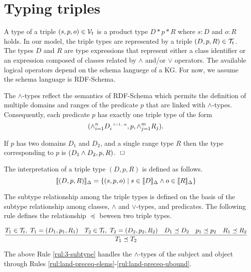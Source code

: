 \documentclass[runningheads]{llncs}
\newcommand{\s}{\scriptscriptstyle\ \,}
\newcommand{\llb}{\llbracket}
\newcommand{\rrb}{\rrbracket}
\newcommand{\V}{{\cal V}}
\newcommand{\T}{{\cal T}}
\newcommand{\finbox}{\phantom{.}\hfill\Box}
\begin{document}
\section{Typing triples\label{sec:triples}}



A type of a triple $(s,p,o)\in\V_t$ is a product type $D*p*R$
where $s:D$ and $o:R$ holds. In our model, the triple types are
represented by a triple $(D,p,R)\in\T_t$. The types $D$ and $R$ are
type expressions that represent either a class identifier or an 
expression composed of classes related by $\land$ and/or $\lor$
operators. The available logical operators depend on the schema
languege of a KG. For now, we assume the schema language is
RDF-Schema.

The $\land$-types reflect the semantics of RDF-Schema \cite{rdfschema}
which permits the definition of multiple domains and ranges of the
predicate $p$ that are linked with $\land$-types. Consequently, each
predicate $p$ has exactly one triple type of the form
$$(\land_{i=1}^n\/D_i^{\s\/i=1..n}, p ,\land_{j=1}^m\/R_j).$$

\begin{example}
  If $p$ has two domains $D_1$ and $D_2$, and a single
range type $R$ then the type corresponding to $p$ is
$(D_1\land\/D_2,p,R)$. $\finbox$
\end{example}

\noindent
The interpretation of a triple type $(D,p,R)$ is defined as
follows.
$$\llb(D,p,R)\rrb_\Delta=\{(s,p,o)\mid\/s\in\llb\/D\rrb_\Delta\land\/o\in\llb\/R\rrb_\Delta \}$$

The subtype relationship among the triple types is defined on the
basis of the subtype relationship among classes, $\land$ and
$\lor$-types, and predicates. The following rule defines the
relationship $\preceq$ beween two triple types.

\begin{equation}
\label{rul:3-subtype}
\dfrac{T_1\in\T_t,\ T_1=(D_1,p_1,R_1)\quad T_2\in\T_t,\ T_2=(D_2,p_2,R_2)\quad\/D_1\preceq\/D_2\quad\/p_1\preceq\/p_2\quad\/R_1\preceq\/R_2}
      {T_1\preceq\/T_2}
\end{equation}

\noindent
The above Rule \ref{rul:3-subtype} handles the $\land$-types of the
subject and object through Rules
\ref{rul:land-preceq-elems}-\ref{rul:land-preceq-ubound}.
\end{document}
